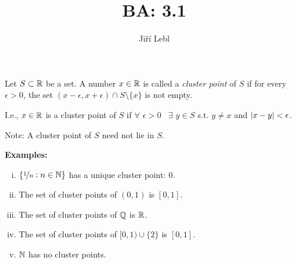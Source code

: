 \documentclass[10pt,aspectratio=149]{beamer}
\author{Ji\v{r}\'i Lebl}
\institute[OSU]{%
Departemento pri Matematiko de Oklahoma {\^S}tata Universitato}
\title{BA: 3.1}
\date{}
\begin{document}
\begin{frame}
\titlepage
\end{frame}

\begin{frame}
\begin{definition}
Let $S \subset {\mathbb{R}}$ be a set.  A number $x \in {\mathbb{R}}$ is called
a \emph{cluster point} of $S$
if for every $\epsilon > 0$, the set $(x-\epsilon,x+\epsilon) \cap S
\setminus \{ x \}$ is not empty.
\end{definition}

\pause

I.e.,
$x \in {\mathbb{R}}$ is a cluster point of $S$ if $\forall$ $\epsilon > 0$ ~$\exists$ $y \in
S$ s.t. $y \not= x$ and $\left\lvert {x - y} \right\rvert < \epsilon$.

\pause
\medskip

Note: A cluster point of $S$ need not lie in $S$.

\pause
\medskip

\textbf{Examples:}
\begin{enumerate}[(i)]
\item
$\{ \nicefrac{1}{n} : n \in {\mathbb{N}} \}$ has a unique cluster point: $0$.
\item\pause The set of cluster points of $(0,1)$ is
$[0,1]$.
\item\pause
The set of cluster points of ${\mathbb{Q}}$ is ${\mathbb{R}}$.
\item\pause
The set of cluster points of $[0,1) \cup \{ 2 \}$ is $[0,1]$.
\item\pause
${\mathbb{N}}$ has no cluster points.
\end{enumerate}

\end{frame}
\end{document}
